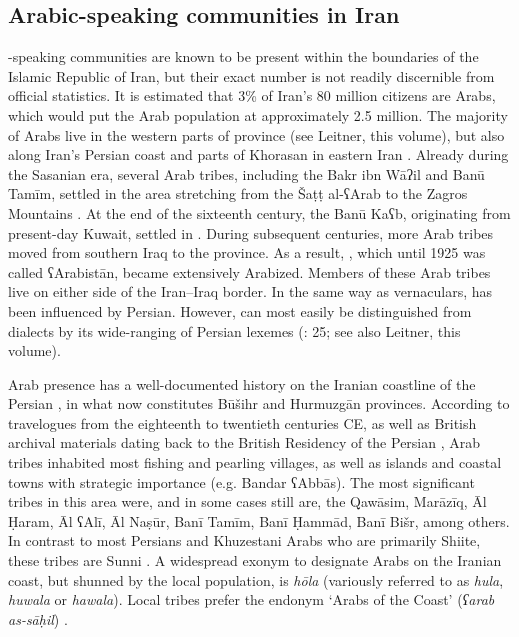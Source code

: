 \documentclass[output=paper]{langsci/langscibook}
\begin{document}
\subsection{Arabic-speaking communities in Iran}
-speaking communities are known to be present within the boundaries of the Islamic Republic of Iran, but their exact number is not readily discernible from official statistics. It is estimated that 3\% of Iran’s 80 million citizens are Arabs, which would put the Arab population at approximately 2.5 million. The majority of Arabs live in the western parts of  province (see Leitner, this volume), but also along Iran’s Persian  coast and parts of Khorasan in eastern Iran \citep{Oberling2011}. Already during the Sasanian era, several Arab tribes, including the Bakr ibn Wāʔil and Banū Tamīm, settled in the area stretching from the Šaṭṭ al-ʕArab to the Zagros Mountains \citep{Daniel2011}. At the end of the sixteenth century, the Banū Kaʕb, originating from present-day Kuwait, settled in . During subsequent centuries, more Arab tribes moved from southern Iraq to the province. As a result, , which until 1925 was called ʕArabistān, became extensively Arabized. Members of these Arab tribes live on either side of the Iran–Iraq border. In the same way as   vernaculars,   has been influenced by Persian. However,   can most easily be distinguished from  dialects by its wide-ranging  of Persian lexemes (\citealt{Ingham1997}: 25; see also Leitner, this volume).

Arab presence has a well-documented history on the Iranian coastline of the Persian , in what now constitutes Būšihr and Hurmuzgān provinces. According to travelogues from the eighteenth to twentieth centuries CE, as well as British archival materials dating back to the British Residency of the Persian , Arab tribes inhabited most fishing and pearling villages, as well as islands and coastal towns with strategic importance (e.g. Bandar ʕAbbās). The most significant tribes in this area were, and in some cases still are, the Qawāsim, Marāzīq, Āl Ḥaram, Āl ʕAlī, Āl Naṣūr, Banī Tamīm, Banī Ḥammād, Banī Bišr, among others. In contrast to most Persians and Khuzestani Arabs who are primarily Shiite, these tribes are Sunni . A widespread exonym to designate Arabs on the Iranian coast, but shunned by the local population, is \textit{hōla} (variously referred to as \textit{hula}, \textit{huwala} or \textit{hawala}). Local tribes prefer the endonym ‘Arabs of the Coast’ (\textit{ʕarab} \textit{as-sāḥil}) \citep[110]{Gazsi2017}.
\end{document}
